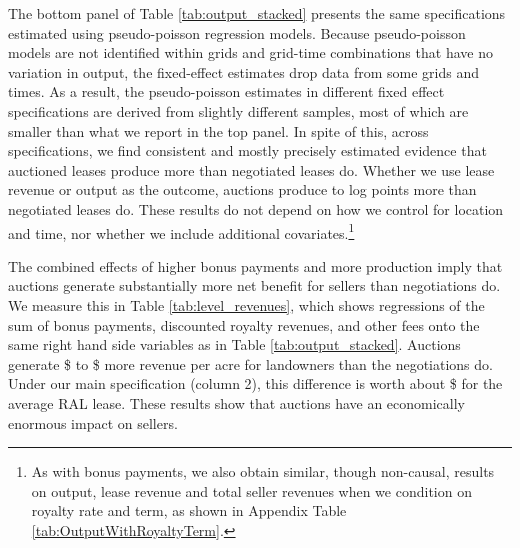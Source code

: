 \documentclass[12pt]{article}
\newcommand{\inputy}[1]{\unskip}
\begin{document}
The bottom panel of Table \ref{tab:output_stacked} presents the same specifications estimated using pseudo-poisson regression models.  Because pseudo-poisson models are not identified within grids and grid-time combinations that have no variation in output, the fixed-effect estimates drop data from some grids and times.  As a result, the pseudo-poisson estimates in different fixed effect specifications are derived from slightly different samples, most of which are smaller than what we report in the top panel.  In spite of this, across specifications, we find consistent and mostly precisely estimated evidence that auctioned leases produce more than negotiated leases do.  Whether we use lease revenue or output as the outcome, auctions produce \inputy{../output/estimates/poisson_output_min.tex} to \inputy{../output/estimates/poisson_output_max.tex} log points more than negotiated leases do.  These results do not depend on how we control for location and time, nor whether we include additional covariates.\footnote{As with bonus payments, we also obtain similar, though non-causal, results on output, lease revenue and total seller revenues when we condition on royalty rate and term, as shown in Appendix Table \ref{tab:OutputWithRoyaltyTerm}.}

The combined effects of higher bonus payments and more production imply that auctions generate substantially more net benefit for sellers than negotiations do.  We measure this in Table \ref{tab:level_revenues}, which shows regressions of the sum of bonus payments, discounted royalty revenues, and other fees onto the same right hand side variables as in Table \ref{tab:output_stacked}.  Auctions generate  \$\inputy{../output/estimates/sellerrev_min.tex} to \$\inputy{../output/estimates/sellerrev_max.tex} more revenue per acre for landowners than the negotiations do.  Under our main specification (column 2), this difference is worth about \$\inputy{../output/estimates/SellerRevenue_Grid10Yr_total.tex} for the average RAL lease.  These results show that auctions have an economically enormous impact on sellers.
\end{document}
